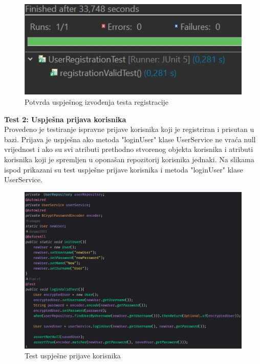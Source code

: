 					\begin{figure}[H]
			\includegraphics[scale=0.4]{slike/JUnit_register.JPG} %
			\centering
			\caption{Potvrda uspješnog izvođenja testa registracije}
			\label{Potvrda uspješnog izvođenja testa registracije}
		\end{figure}
		
		
\textbf{Test 2: Uspješna prijava korisnika} \\
Provedeno je testiranje ispravne prijave korisnika koji je registriran i prisutan u bazi. Prijava je uspješna ako metoda "loginUser" klase UserService ne vraća null vrijednost i ako su svi atributi prethodno stvorenog objekta korisnika i atributi korisnika koji je spremljen u oponašan repozitorij korisnika jednaki. Na slikama ispod prikazani su test uspješne prijave korisnika i metoda "loginUser" klase UserService.

				\begin{figure}[H]
			\includegraphics[scale=0.4]{slike/loginValidTest.PNG} %
			\centering
			\caption{Test uspješne prijave korisnika}
			\label{Test uspješne prijave korisnika}
		\end{figure}
		
